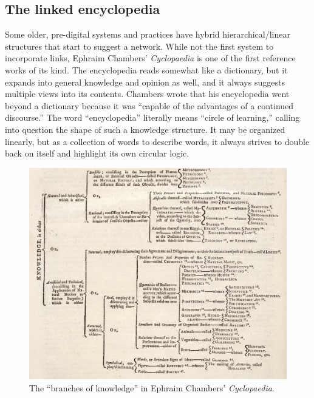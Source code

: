 \subsection{The linked encyclopedia}

Some older, pre-digital systems and practices have hybrid hierarchical/linear structures that start to suggest a network. While not the first system to incorporate links, Ephraim Chambers' \emph{Cyclopaedia} is one of the first reference works of its kind. The encyclopedia reads somewhat like a dictionary, but it expands into general knowledge and opinion as well, and it always suggests multiple views into its contents. Chambers wrote that his encyclopedia went beyond a dictionary because it was ``capable of the advantages of a continued discourse.''\autocites[i]{chambers_cyclopaedia_1728}[64]{yeo_solution_2003} The word ``encyclopedia'' literally means ``circle of learning,'' calling into question the shape of such a knowledge structure. It may be organized linearly, but as a collection of words to describe words, it always strives to double back on itself and highlight its own circular logic.

\begin{figure}[ht]
\centering
\includegraphics[width=400pt]{figures/cyclopaedia-tree}
\caption{The ``branches of knowledge'' in Ephraim Chambers' \emph{Cyclopaedia}.}
\label{fig:cyclopaedia-tree}
\end{figure}

